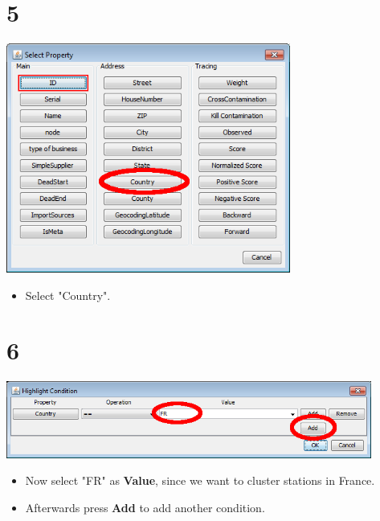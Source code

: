 \documentclass{beamer}
\begin{document}
\section{5}
\begin{frame}
	\begin{center}
  		\includegraphics[width=0.7\textwidth]{5.png}
	\end{center}
	\begin{itemize}
		\item Select "Country".
	\end{itemize}
\end{frame}

\section{6}
\begin{frame}
	\begin{center}
  		\includegraphics[width=0.9\textwidth]{6.png}
	\end{center}
	\begin{itemize}
		\item Now select "FR" as \textbf{Value}, since we want to cluster stations in France.
		\item Afterwards press \textbf{Add} to add another condition.
	\end{itemize}
\end{frame}
\end{document}
